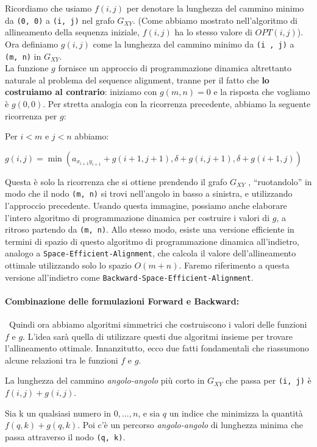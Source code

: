 Ricordiamo che
usiamo $f(i, j)$ per denotare la lunghezza del cammino minimo da
\texttt{(0,\ 0)} a \texttt{(i,\ j)} nel grafo $G_{XY}$. (Come abbiamo
mostrato nell'algoritmo di allineamento della sequenza iniziale,
$f(i, j)$ ha lo stesso valore di $OPT(i, j)$).\\ Ora definiamo
$g(i, j)$ come la lunghezza del cammino minimo da \texttt{(i\ ,\ j)} a
\texttt{(m,\ n)} in $G_{XY}$.\\ La funzione $g$ fornisce un approccio
di programmazione dinamica altrettanto naturale al problema del sequence
alignment, tranne per il fatto che \textbf{lo costruiamo al contrario}:
iniziamo con $g(m, n) = 0$ e la risposta che vogliamo è $g(0, 0)$.
Per stretta analogia con la ricorrenza precedente, abbiamo la seguente
ricorrenza per $g$:
\begin{myblockquote} Per $i < m$ e $j < n$ abbiamo:
	\begin{center}
		$g(i, j) = \min(a_{x_{i+1} y_{i+1}} + g(i + 1, j + 1), \delta + g(i, j + 1), \delta + g (i + 1, j))$
	\end{center}
\end{myblockquote}

Questa è solo la ricorrenza che si ottiene prendendo il grafo $G_{XY}$
, ``ruotandolo'' in modo che il nodo \texttt{(m,\ n)} si trovi
nell'angolo in basso a sinistra, e utilizzando l'approccio precedente.
Usando questa immagine, possiamo anche elaborare l'intero algoritmo di
programmazione dinamica per costruire i valori di $g$, a ritroso
partendo da \texttt{(m,\ n)}. Allo stesso modo, esiste una versione
efficiente in termini di spazio di questo algoritmo di programmazione
dinamica all'indietro, analogo a \texttt{Space-Efficient-Alignment}, che
calcola il valore dell'allineamento ottimale utilizzando solo lo spazio
$O(m+n)$. Faremo riferimento a questa versione all'indietro
come \texttt{Backward-Space-Efficient-Alignment}.\\

\paragraph*{Combinazione delle formulazioni Forward e Backward:}\
Quindi ora
abbiamo algoritmi simmetrici che costruiscono i valori delle funzioni
$f$ e $g$. L'idea sarà quella di utilizzare questi due algoritmi
insieme per trovare l'allineamento ottimale. Innanzitutto, ecco due
fatti fondamentali che riassumono alcune relazioni tra le funzioni $f$
e $g$.
\begin{myblockquote}
	La lunghezza del cammino \emph{angolo-angolo}
	più corto in $G_{XY}$ che passa per \texttt{(i, j)} è
	$f(i, j) + g(i, j)$.
\end{myblockquote}
\begin{myblockquote}
	Sia k un qualsiasi numero in ${0, . . . , n}$, e sia $q$ un indice
	che minimizza la quantità $f(q, k) + g(q, k)$. Poi c'è un percorso
	\emph{angolo-angolo} di lunghezza minima che passa attraverso il nodo \texttt{(q, k)}.
\end{myblockquote}

